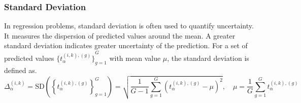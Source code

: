 \subsubsection{Standard Deviation}
In regression problems, standard deviation is often used to quantify uncertainty. It measures the dispersion of predicted values around the mean. A greater standard deviation indicates greater uncertainty of the prediction. For a set of predicted values ${\{t_{\alpha}^{(i,k),(g)} \}}_{g=1}^G $ with mean value $\mu $, the standard deviation is defined as.
\begin{equation}
\Delta_{\alpha}^{(i,k)}=\text{SD}\left({\left\{t_{\alpha}^{(i,k),(g)}\right\}}_{g=1}^G\right)=\sqrt {\frac{1}{G-1}\sum_{g=1}^G {\left(t_{\alpha}^{(i,k),(g)}-\mu\right)}^2} , \quad\mu=\frac{1}{G}\sum_{g=1}^{G}{t_{\alpha}^{(i,k),(g)}}
\label{eq:crowd.Eq.6.uncertainty.sd}
\end{equation}

